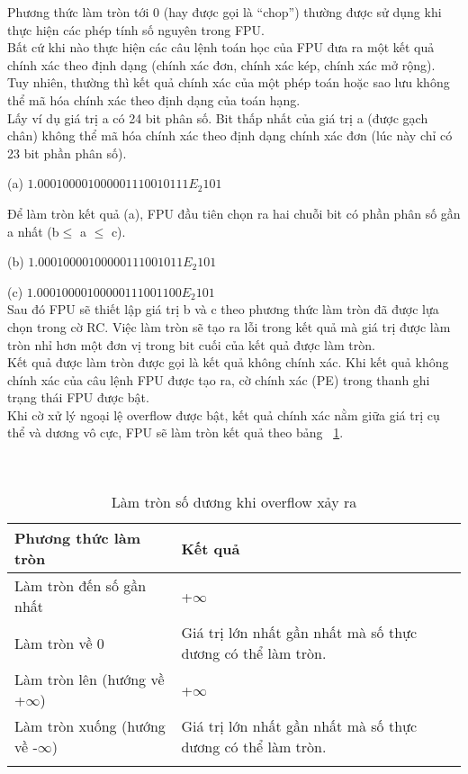 	Phương thức làm tròn tới 0 (hay được gọi là “chop”) thường được sử dụng khi thực hiện các phép tính số nguyên trong FPU. \\
	
	Bất cứ khi nào thực hiện các câu lệnh toán học của FPU đưa ra một kết quả chính xác theo định dạng (chính xác đơn, chính xác kép, chính xác mở rộng). Tuy nhiên, thường thì kết quả chính xác của một phép toán hoặc sao lưu không thể mã hóa chính xác theo định dạng của toán hạng.\\
	
	Lấy ví dụ giá trị a có 24 bit phân số. Bit thấp nhất của giá trị a (được gạch chân) không thể mã hóa chính xác theo định dạng chính xác đơn (lúc này chỉ có 23 bit phần phân số).
	
		(a)	$1.0001 0000 1000 0011 1001 0111E_{2} 101$
		
		Để làm tròn kết quả (a), FPU đầu tiên chọn ra hai chuỗi bit có phần phân số gần a nhất (b$\mathbb{\le}$ a $\mathbb{\le}$ c).
		
		(b) $1.0001 0000 1000 0011 1001 011E_{2} 101$
		
		(c)  $1.0001 0000 1000 0011 1001 100E_{2} 101$\\
				
		Sau đó FPU sẽ thiết lập giá trị b và c theo phương thức làm tròn đã được lựa chọn trong cờ RC. Việc làm tròn sẽ tạo ra lỗi trong kết quả mà giá trị được làm tròn nhỉ hơn một đơn vị trong bit cuối của kết quả được làm tròn.\\
		
	Kết quả được làm tròn được gọi là kết quả không chính xác. Khi kết quả không chính xác của câu lệnh FPU được tạo ra, cờ chính xác (PE) trong thanh ghi trạng thái FPU được bật.\\	
	
	Khi cờ xử lý ngoại lệ overflow được bật, kết quả chính xác nằm giữa giá trị cụ thể  và dương vô cực, FPU sẽ làm tròn kết quả theo bảng ~\ref{tb:RCOverflow}.
	\\ \\ \\
		\begin{longtable} {|m{6cm}|m{6cm}|}
			\hline
				Phương thức làm tròn & Kết quả \\			
			\hline						
			\hline
				Làm tròn đến số gần nhất & +$\mathbf{\infty}$\\
			\hline
				Làm tròn về 0 & Giá trị lớn nhất gần nhất mà số thực dương có thể làm tròn.\\
			\hline
				Làm tròn lên (hướng về +$\mathbf{\infty}$) &  +$\mathbf{\infty}$\\
			\hline
				Làm tròn xuống (hướng về -$\mathbf{\infty}$) & Giá trị lớn nhất gần nhất mà số thực dương có thể làm tròn.\\		
			\hline
			\caption{Làm tròn số dương khi overflow xảy ra}
			\label{tb:RCOverflow}
		\end{longtable}

